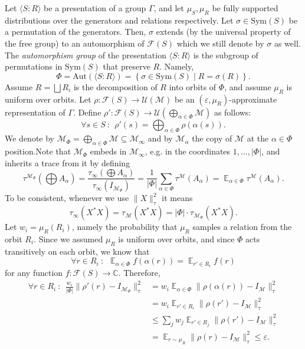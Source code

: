 \documentclass[11pt]{article}
\theoremstyle{definition}
\newcommand{\Id}{\ensuremath{I}}
\DeclareMathOperator*{\Expectation}{\mathbb{E}}
\newcommand{\complex}{\ensuremath{\mathbb{C}}}
\newcommand{\mF}{\ensuremath{\mathcal{F}}}
\newcommand{\mM}{\ensuremath{\mathcal{M}}}
\newcommand{\mU}{\ensuremath{\mathcal{U}}}
\newcommand{\eps}{\varepsilon}
\begin{document}
  Let $\langle S\colon R\rangle$ be a presentation of a group $\Gamma$, and let $\mu_S, \mu_R$ be fully supported distributions over the generators and relations respectively.
  Let $\sigma\in \textrm{Sym}(S)$ be a permutation of the generators. 
  Then, $\sigma$ extends (by the universal property of the free group) to an automorphism of $\mF(S)$ which we still denote by $\sigma$ as well. 
  The \emph{automorphism group} of the presentation  $\langle S\colon R\rangle$ is the subgroup of permutations in $\textrm{Sym}(S)$ that preserve $R$. Namely,  
  \[
\Phi=\textrm{Aut}(\langle S\colon R\rangle )=\left\{ \sigma \in \textrm{Sym}(S)\mid R=\sigma(R) \right\}.
  \]
Assume $R=\bigsqcup R_i$ is the decomposition of $R$ into orbits of $\Phi$, and assume $\mu_R$ is uniform over orbits. Let $\rho\colon \mF(S)\to \mU(\mM)$ be an $(\eps,\mu_R)$-approximate representation of $\Gamma$. Define $\rho'\colon \mF(S)\to \mU(\bigoplus_{\alpha\in \Phi}\mM)$ as follows:
    \[
\forall s\in S\ \colon \ \ \rho'(s)=\bigoplus_{\alpha\in \Phi} \rho(\alpha(s)).
    \]
    We denote by $\mM_\Phi=\bigoplus_{\alpha\in \Phi}\mM\subseteq \mM_\infty$ and by $\mM_\alpha$ the copy of $\mM$ at the $\alpha\in \Phi$ position.Note that $\mM_\Phi$ embeds in $\mM_\infty$, e.g. in the coordinates $1,...,|\Phi|$, and inherits a trace from it by defining 
    \[
    \tau^{\mM_\Phi}(\bigoplus A_\alpha)=\frac{\tau_\infty(\bigoplus A_\alpha)}{\tau_\infty(\Id_{\mM_\Phi})}=\frac{1}{|\Phi|}\sum_{\alpha\in \Phi}\tau^\mM(A_\alpha)=\Expectation_{\alpha\in \Phi}\tau^\mM(A_\alpha).
    \]
    To be consistent, whenever we use $\|X\|_\tau^2$ it means $$\tau_\infty(X^*X)=\tau_\mM(X^*X)=|\Phi|\cdot\tau_{\mM_\Phi}(X^*X).$$
    Let $w_i=\mu_R(R_i)$, namely the probability that $\mu_R$ samples a relation from the orbit $R_i$. Since we assumed $\mu_R$ is uniform over orbits, and since $\Phi$ acts transitively on each orbit, we know that 
    \[
    \forall r\in R_i\ \colon \ \ \Expectation_{\alpha\in \Phi}f(\alpha(r))=\Expectation_{r'\in R_i}f(r)
    \]
    for any function $f\colon \mF(S)\to \complex$. Therefore, 
    \[
    \begin{split}
       \forall r\in R_i\ \colon \ \  \frac{w_i}{|\Phi|}\|\rho'(r)-\Id_{\mM_\Phi}\|_\tau^2&=w_i\Expectation_{\alpha\in \Phi} \|\rho(\alpha(r))-\Id_\mM\|_\tau^2\\
        &=w_i\Expectation_{r'\in R_i} \|\rho(r')-\Id_\mM\|_\tau^2\\
        &\leq \sum_j w_j\Expectation_{r'\in R_j} \|\rho(r')-\Id_\mM\|_\tau^2\\
        &=\Expectation_{r\sim \mu_R}\|\rho(r)-\Id_\mM\|_\tau^2\leq \eps.
    \end{split}
    \]
\end{document}
